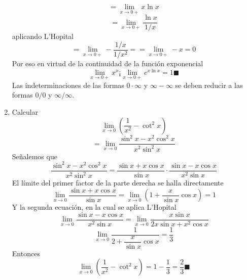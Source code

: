 \documentclass[10pt,twoside]{SelfArx} %
\begin{document}
\begin{enumerate}
\begin{equation}
\end{equation}
   	\begin{equation}
	=\lim\limits_{x\rightarrow0+}x\ln x
   	\end{equation}
   	\begin{equation}
   		=\lim\limits_{x\rightarrow0+}\dfrac{\ln x}{1/x} 
 	\end{equation}
 	aplicando L'Hopital
 	\begin{equation}
 		=\lim\limits_{x\rightarrow0+}-\dfrac{1/x}{1/x^{2}}=	=\lim\limits_{x\rightarrow0+}-x=0
 	\end{equation}
   	Por eso en virtud de la continuidad de la función exponencial
   	\begin{equation}
   	\lim\limits_{x\rightarrow0+}x^{x}¡\lim\limits_{x\rightarrow0+}e^{x\ln x}=1\blacksquare
   	\end{equation}
   	Las indeterminaciones de las formas $ 0\cdot \infty $ y $ \infty-\infty $ se deben reducir a las formas $ 0/0 $ y $ \infty/\infty $.
   	\item Calcular\\
   	\begin{equation}
   	\lim\limits_{x\rightarrow0}\left (\dfrac{1}{x^{2}}-\cot^{2}x\right )
   	\end{equation}
   	\begin{equation}
   	=\lim\limits_{x\rightarrow0}\dfrac{\sin^{2}x-x^{2}\cos^{2}x}{x^{2}\sin^{2}x}
   	\end{equation}
   	Señalemos que 
   	\[  \dfrac{\sin^{2}x-x^{2}\cos^{2}x}{x^{2}\sin^{2}x}=\dfrac{\sin x+x\cos x}{\sin x}\cdot\dfrac{\sin x-x\cos x}{x^{2}\sin x}\]
   	El límite del primer factor de la parte derecha se halla directamente
   	\begin{equation}
   	\lim\limits_{x\rightarrow0}\dfrac{\sin x+x\cos x}{\sin x}=\lim\limits_{x\rightarrow0}\left (1+\dfrac{x}{\sin x}\cos x\right )=1
   	\end{equation}
   	Y la segunda ecuaci\'on, en la cual se aplica L'Hopital
   	\begin{equation}
   	\lim\limits_{x\rightarrow0}\dfrac{\sin x-x\cos x}{x^{2}\sin x}=\lim\limits_{x\rightarrow0}\dfrac{x\sin x}{2x\sin x+x^{2}\cos x}
   	\end{equation}
   	\begin{equation}
   	\lim\limits_{x\rightarrow0}\dfrac{1}{2+\dfrac{x}{\sin x}\cos x}=\dfrac{1}{3}
   	\end{equation}
Entonces
\begin{equation}
  	\lim\limits_{x\rightarrow0}\left (\dfrac{1}{x^{2}}-\cot^{2}x\right )=1-\dfrac{1}{3}=\dfrac{2}{3}\blacksquare
\end{equation}   	
   	
   	
   	
   \end{enumerate}%
   
\end{document}
